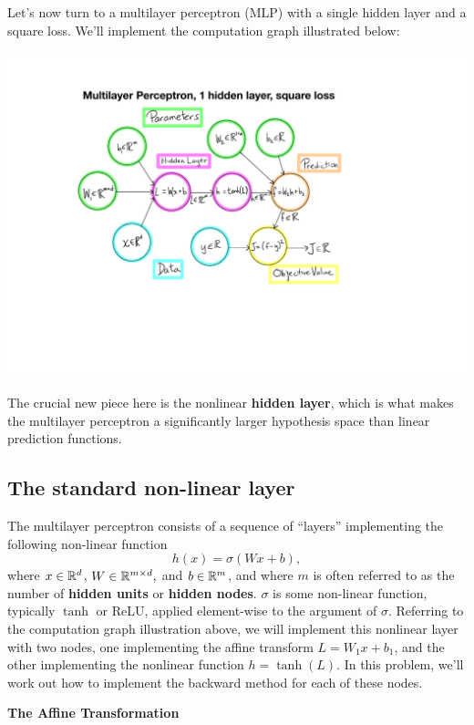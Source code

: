 \documentclass{article}
\newcommand{\nyuparagraph}[1]{\vspace{0.3cm}\textcolor{nyupurple}{\bf \large #1}\\}
\theoremstyle{plain}
\theoremstyle{definition}
\begin{document}
Let's now turn to a multilayer perceptron (MLP)
with a single hidden layer and a square loss. We'll implement the
computation graph illustrated below:
\begin{center}
\includegraphics{MLP-computation-graph.pdf}
\par\end{center}

The crucial new piece here is the nonlinear \textbf{hidden layer},
which is what makes the multilayer perceptron a significantly larger
hypothesis space than linear prediction functions.

\subsection{The standard non-linear layer}

The multilayer perceptron consists of a sequence of ``layers'' implementing
the following non-linear function
\[
h(x)=\sigma\left(Wx+b\right),
\]
where $x\in\mathbb{R}^{d}$, $W\in\mathbb{R}^{m\times d},$ and $b\in\mathbb{R}^{m}$,
and where $m$ is often referred to as the number of\textbf{ hidden
units }or\textbf{ hidden nodes}. $\sigma$ is some non-linear function,
typically $\tanh$ or ReLU, applied element-wise to the argument of
$\sigma$. Referring to the computation graph illustration above,
we will implement this nonlinear layer with two nodes, one implementing
the affine transform $L=W_{1}x+b_{1}$, and the other implementing
the nonlinear function $h=\tanh(L)$. In this problem, we'll work
out how to implement the backward method for each of these nodes.

\nyuparagraph{The Affine Transformation}
\end{document}
